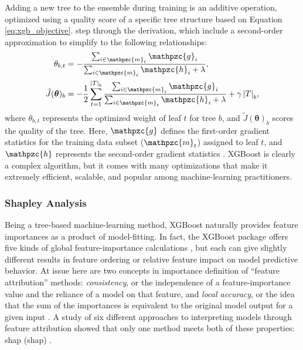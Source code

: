 Adding a new tree to the ensemble during training is an additive operation, optimized using a quality score of a specific tree structure based on Equation \ref{eq:xgb_objective}. \citet[Equations 3--6]{chen_xgboost_2016} step through the derivation, which include a second-order approximation to simplify to the following relationships:
\begin{equation}
\label{eq:xgb_obj_simple}
\begin{aligned}
    \theta_{b,t} &= -\frac{\sum_{i\in\mathpzc{m}_t}\mathpzc{g}_{i}}{\sum_{i\in\mathpzc{m}_t}\mathpzc{h}_{i} + \lambda}, \\
    \tilde{J}(\boldsymbol\theta)_{b} &= -\frac{1}{2}\sum_{t=1}^{\left|T\right|_b}{\frac{\sum_{i\in\mathpzc{m}_t}\mathpzc{g}_{i}}{\sum_{i\in\mathpzc{m}_t}\mathpzc{h}_{i} + \lambda} + \gamma \left|T\right|_b},
\end{aligned}
\end{equation}
where $\theta_{b,t}$ represents the optimized weight of leaf $t$ for tree $b$, and $\tilde{J}(\boldsymbol\theta)_{b}$ scores the quality of the tree. Here, $\mathpzc{g}$ defines the first-order gradient statistics for the training data subset ($\mathpzc{m}_t$) assigned to leaf $t$, and $\mathpzc{h}$ represents the second-order gradient statistics \citep{chen_xgboost_2016}. XGBoost is clearly a complex algorithm, but it comes with many optimizations that make it extremely efficient, scalable, and popular among machine-learning practitioners.

\subsubsection{Shapley Analysis}\label{ch3:xgb_shapley}

Being a tree-based machine-learning method, XGBoost naturally provides feature importances as a product of model-fitting. In fact, the XGBoost package offers five kinds of global feature-importance calculations \citep{xgboost_developers_xgboost_2020}, but each can give slightly different results in feature ordering or relative feature impact on model predictive behavior. At issue here are two concepts in importance definition of ``feature attribution'' methods: \textit{consistency}, or the independence of a feature-importance value and the reliance of a model on that feature, and \textit{local accuracy}, or the idea that the sum of the importances is equivalent to the original model output for a given input \citep{lundberg_interpretable_2020}. A study of six different approaches to interpreting models through feature attribution showed that only one method meets both of these properties: \acrlong{shap} (\acrshort{shap}) \citep{lundberg_consistent_2019}.

